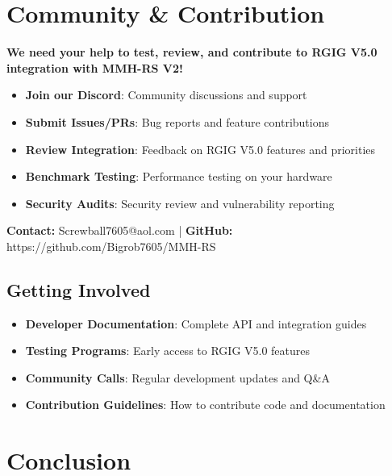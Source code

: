 \documentclass[12pt,a4paper]{article}
\makeatletter
\newcommand{\email}{Screwball7605@aol.com}
\newcommand{\github}{https://github.com/Bigrob7605/MMH-RS}
\makeatother
\begin{document}
\section{Community \& Contribution}

\begin{tcolorbox}[colback=orange!10,colframe=orange!50,title=\textbf{Help Us Build RGIG V5.0 Integration}]
\textbf{We need your help to test, review, and contribute to RGIG V5.0 integration with MMH-RS V2!}

\begin{itemize}
    \item \textbf{Join our Discord}: Community discussions and support
    \item \textbf{Submit Issues/PRs}: Bug reports and feature contributions
    \item \textbf{Review Integration}: Feedback on RGIG V5.0 features and priorities
    \item \textbf{Benchmark Testing}: Performance testing on your hardware
    \item \textbf{Security Audits}: Security review and vulnerability reporting
\end{itemize}

\textbf{Contact:} \email{} | \textbf{GitHub:} \github
\end{tcolorbox}

\subsection{Getting Involved}
\begin{itemize}
    \item \textbf{Developer Documentation}: Complete API and integration guides
    \item \textbf{Testing Programs}: Early access to RGIG V5.0 features
    \item \textbf{Community Calls}: Regular development updates and Q\&A
    \item \textbf{Contribution Guidelines}: How to contribute code and documentation
\end{itemize}

\section{Conclusion}
\end{document}
